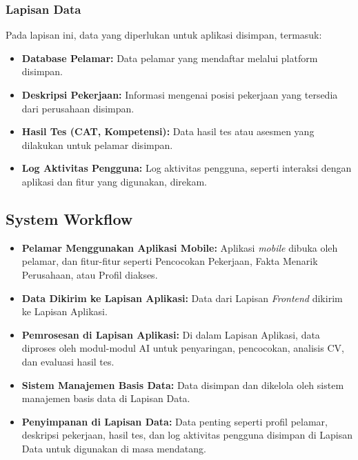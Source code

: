 \documentclass[journal,article,submit,pdftex,moreauthors]{Definitions/mdpi}
\begin{document}
\subsubsection{Lapisan Data}
Pada lapisan ini, data yang diperlukan untuk aplikasi disimpan, termasuk:  
\begin{itemize}[left=2em]
    \item \textbf{Database Pelamar:} Data pelamar yang mendaftar melalui platform disimpan.
    \item \textbf{Deskripsi Pekerjaan:} Informasi mengenai posisi pekerjaan yang tersedia dari perusahaan disimpan.
    \item \textbf{Hasil Tes (CAT, Kompetensi):} Data hasil tes atau asesmen yang dilakukan untuk pelamar disimpan.
    \item \textbf{Log Aktivitas Pengguna:} Log aktivitas pengguna, seperti interaksi dengan aplikasi dan fitur yang digunakan, direkam.
\end{itemize}

\subsection{System Workflow}
\begin{itemize}[left=2em]
    \item \textbf{Pelamar Menggunakan Aplikasi Mobile:} Aplikasi \textit{mobile} dibuka oleh pelamar, dan fitur-fitur seperti Pencocokan Pekerjaan, Fakta Menarik Perusahaan, atau Profil diakses.
    
    \item \textbf{Data Dikirim ke Lapisan Aplikasi:} Data dari Lapisan \textit{Frontend} dikirim ke Lapisan Aplikasi.
    
    \item \textbf{Pemrosesan di Lapisan Aplikasi:} Di dalam Lapisan Aplikasi, data diproses oleh modul-modul AI untuk penyaringan, pencocokan, analisis CV, dan evaluasi hasil tes.
    
    \item \textbf{Sistem Manajemen Basis Data:} Data disimpan dan dikelola oleh sistem manajemen basis data di Lapisan Data.
    
    \item \textbf{Penyimpanan di Lapisan Data:} Data penting seperti profil pelamar, deskripsi pekerjaan, hasil tes, dan log aktivitas pengguna disimpan di Lapisan Data untuk digunakan di masa mendatang.
\end{itemize}
\end{document}
